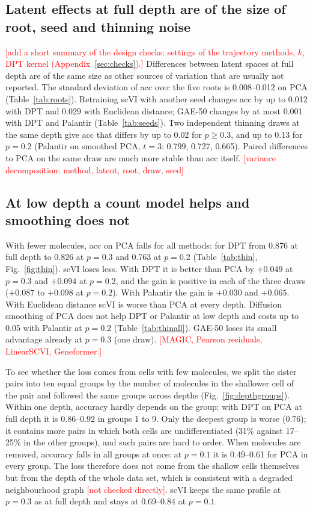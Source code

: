\documentclass[10pt,a4paper,twocolumn]{article}
\newcommand{\todo}[1]{\textcolor{red}{[#1]}}
\begin{document}
\subsection{Latent effects at full depth are of the size of root, seed and thinning noise}
\todo{add a short summary of the design checks: settings of the trajectory methods, $k$, DPT kernel (Appendix~\ref{sec:checks}).}
Differences between latent spaces at full depth are of the same size as other sources of
variation that are usually not reported. The standard deviation of acc over the five roots is
0.008--0.012 on PCA (Table~\ref{tab:roots}). Retraining scVI with another seed changes acc by up
to 0.012 with DPT and 0.029 with Euclidean distance; GAE-50 changes by at most 0.001 with DPT and
Palantir (Table~\ref{tab:seeds}). Two independent thinning draws at the same depth give acc that
differs by up to 0.02 for $p \ge 0.3$, and up to 0.13 for $p = 0.2$ (Palantir on smoothed PCA,
$t=3$: 0.799, 0.727, 0.665). Paired differences to PCA on the same draw are much more stable than
acc itself. \todo{variance decomposition: method, latent, root, draw, seed}

\subsection{At low depth a count model helps and smoothing does not}
With fewer molecules, acc on PCA falls for all methods: for DPT from 0.876 at full depth to 0.826
at $p=0.3$ and 0.763 at $p=0.2$ (Table~\ref{tab:thin}, Fig.~\ref{fig:thin}). scVI loses less. With
DPT it is better than PCA by $+0.049$ at $p=0.3$ and $+0.094$ at $p=0.2$, and the gain is positive
in each of the three draws ($+0.087$ to $+0.098$ at $p=0.2$). With Palantir the gain is $+0.030$
and $+0.065$. With Euclidean distance scVI is worse than PCA at every depth. Diffusion smoothing of
PCA does not help DPT or Palantir at low depth and costs up to 0.05 with Palantir at $p=0.2$
(Table~\ref{tab:thinall}). GAE-50 loses its small advantage already at $p=0.3$ (one draw).
\todo{MAGIC, Pearson residuals, LinearSCVI, Geneformer.}

To see whether the loss comes from cells with few molecules, we split the sister pairs into ten
equal groups by the number of molecules in the shallower cell of the pair and followed the same
groups across depths (Fig.~\ref{fig:depthgroups}). Within one depth, accuracy hardly depends on
the group: with DPT on PCA at full depth it is 0.86--0.92 in groups 1 to 9. Only the deepest group
is worse (0.76); it contains more pairs in which both cells are undifferentiated (31\% against
17--25\% in the other groups), and such pairs are hard to order. When molecules are removed,
accuracy falls in all groups at once: at $p=0.1$ it is 0.49--0.61 for PCA in every group. The loss
therefore does not come from the shallow cells themselves but from the depth of the whole data
set, which is consistent with a degraded neighbourhood graph \todo{not checked directly}. scVI
keeps the same profile at $p=0.3$ as at full depth and stays at 0.69--0.84 at $p=0.1$.
\end{document}
